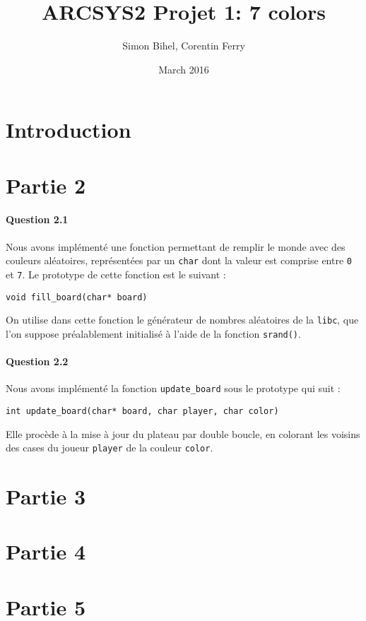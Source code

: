 \documentclass[a4paper]{article}
\title{ARCSYS2 Projet 1: 7 colors}
\author{Simon Bihel, Corentin Ferry}
\date{March 2016}
\begin{document}
    \maketitle
    
    \section{Introduction}
    
    \section{Partie 2}
    \paragraph{Question 2.1}
    Nous avons implémenté une fonction permettant de remplir le monde avec 
des couleurs aléatoires, représentées par un \texttt{char} dont la valeur est
comprise entre \texttt{0} et \texttt{7}.
Le prototype de cette fonction est le suivant :
\begin{lstlisting}
void fill_board(char* board)
\end{lstlisting}
On utilise dans cette fonction le générateur de nombres aléatoires de la 
\texttt{libc}, que l'on suppose préalablement initialisé à l'aide de la 
fonction \texttt{srand()}.

    \paragraph{Question 2.2}
    Nous avons implémenté la fonction \texttt{update\_board} sous le prototype 
qui suit :
\begin{lstlisting}
int update_board(char* board, char player, char color)
\end{lstlisting}
Elle procède à la mise à jour du plateau par double boucle, en colorant les 
voisins des cases du joueur \texttt{player} de la couleur \texttt{color}.
    \section{Partie 3}
    
    \section{Partie 4}
    
    \section{Partie 5}
    
\end{document}
